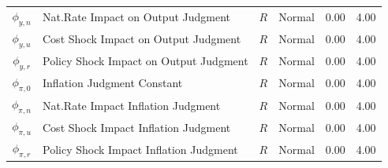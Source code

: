 \documentclass[10pt]{article}
\begin{document}
{\begin{table}
\begin{center}
\begin{tabular}{c|l|c||c|cc}
$\phi_{y,n}$ & Nat.Rate Impact on Output Judgment & $R$ & Normal & 0.00 & 4.00 \\ 
$\phi_{y,u}$ & Cost Shock Impact on Output Judgment & $R$ & Normal & 0.00 & 4.00 \\ 
$\phi_{y,r}$ & Policy Shock Impact on Output Judgment & $R$ & Normal & 0.00 & 4.00 \\ 
$\phi_{\pi,0}$ & Inflation Judgment Constant & $R$ & Normal & 0.00 & 4.00 \\ 
$\phi_{\pi,n}$ & Nat.Rate Impact Inflation Judgment & $R$ & Normal & 0.00 & 4.00 \\ 
$\phi_{\pi,u}$ & Cost Shock Impact Inflation Judgment & $R$ & Normal & 0.00 & 4.00 \\ 
$\phi_{\pi,r}$ & Policy Shock Impact Inflation Judgment & $R$ & Normal & 0.00 & 4.00 \\ \hline
\end{tabular}
\end{center}
\end{table}

}
\end{document}
